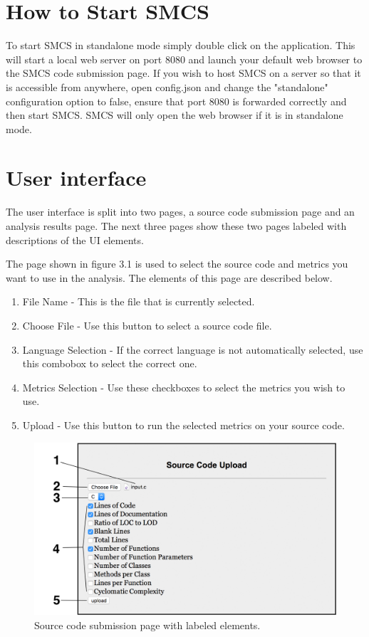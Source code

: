 \documentclass{scrreprt}
\begin{document}
	\section{How to Start SMCS}
	To start SMCS in standalone mode simply double click on the application. 
	This will start a local web server on port 8080 and launch your default web browser to the SMCS code submission page. 
	If you wish to host SMCS on a server so that it is accessible from anywhere, open config.json and change the "standalone" configuration option to false, ensure that port 8080 is forwarded correctly and then start SMCS. 
	SMCS will only open the web browser if it is in standalone mode.

	\section{User interface}
	The user interface is split into two pages, a source code submission page and an analysis results page. The next three pages show these two pages labeled with descriptions of the UI elements.
	
	The page shown in figure 3.1 is used to select the source code and metrics you want to use in the analysis. The elements of this page are described below.
	
	\begin{enumerate}
		\item File Name - This is the file that is currently selected.
		\item Choose File - Use this button to select a source code file.
		\item Language Selection - If the correct language is not automatically selected, use this combobox to select the correct one.
		\item Metrics Selection - Use these checkboxes to select the metrics you wish to use.
		\item Upload - Use this button to run the selected metrics on your source code.
	\end{enumerate}
	
	\begin{figure}[H]
		\centering
		\includegraphics[scale=0.3]{lguiu.png}
		\caption{Source code submission page with labeled elements.}
	\end{figure}
	
\end{document}
